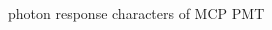 \documentclass[11pt,compress,xcolor=x11names,UTF8]{beamer}
\begin{document}
\begin{frame}{photon response characters of MCP PMT }
\begin{columns}
\begin{column}{.5\textwidth}
\begin{figure}
\end{figure}
\end{column}
\end{columns}
\end{frame}
\end{document}
